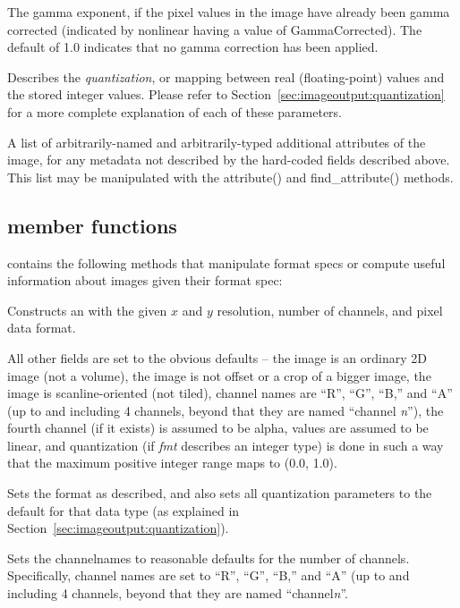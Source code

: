 The gamma exponent, if the pixel values in the image have already been
gamma corrected (indicated by {\cf nonlinear} having a value of {\cf
GammaCorrected}).  The default of 1.0 indicates that no gamma
correction has been applied.
\apiend

Describes the \emph{quantization}, or mapping between real
(floating-point) values and the stored integer values.
Please refer to Section~\ref{sec:imageoutput:quantization} for
a more complete explanation of each of these parameters.
\apiend

A list of arbitrarily-named and arbitrarily-typed additional attributes
of the image, for any metadata not described by the hard-coded fields
described above.  This list may be manipulated with the {\cf
attribute()} and {\cf find_attribute()} methods.
\apiend

\subsection{\ImageSpec member functions}

\noindent \ImageSpec contains the following methods that
manipulate format specs or compute useful information about images given
their format spec:

Constructs an \ImageSpec with the given $x$ and $y$ resolution, number
of channels, and pixel data format.

All other fields are set to the obvious defaults -- the image is an
ordinary 2D image (not a volume), the image is not offset or a crop of a
bigger image, the image is scanline-oriented (not tiled), channel names
are ``R'', ``G'', ``B,'' and ``A'' (up to and including 4 channels,
beyond that they are named ``channel \emph{n}''), the fourth channel (if
it exists) is assumed to be alpha, values are assumed to be linear, and
quantization (if \emph{fmt} describes an integer type) is done in
such a way that the maximum positive integer range maps to (0.0, 1.0).
\apiend

Sets the format as described, and also sets all quantization parameters
to the default for that data type (as explained in 
Section~\ref{sec:imageoutput:quantization}).
\apiend

Sets the {\cf channelnames} to reasonable defaults for the number of
channels.  Specifically, channel names are set to ``R'', ``G'', ``B,''
and ``A'' (up to and including 4 channels, beyond that they are named
``channel\emph{n}''.
\apiend

